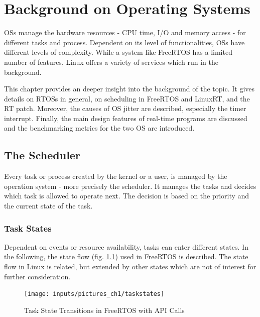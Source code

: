 \chapter{Background on Operating Systems}\label{ch_background}
\acp{OS} manage the hardware resources - \ac{CPU} time, \ac{I/O} and memory access  - for different tasks and process. 
Dependent on its level of functionalities, \acp{OS} have different levels of complexity.
While a system like FreeRTOS has a limited number of features, Linux offers a variety of services which run in the background. 
\par

This chapter provides an deeper insight into the background of the topic. 
It gives details on \acp{RTOS} in general, on scheduling in FreeRTOS and LinuxRT, and the RT patch. 
Moreover, the causes of \ac{OS} jitter are described, especially the timer interrupt. 
Finally, the main design features of real-time programs are discussed and the benchmarking metrics for the two \ac{OS} are introduced. 

\section{The Scheduler}\label{s_scheduler}
Every task or process created by the kernel or a user, is managed by the operation system - more precisely the scheduler. 
It manages the tasks and decides which task is allowed to operate next. 
The decision is based on the priority and the current state of the task. 

\subsection{Task States}\label{ss_task_states}
Dependent on events or resource availability, tasks can enter different states. 
In the following, the state flow (fig. \ref{fig_taskstates}) used in FreeRTOS \cite{freertos} is described. 
The state flow in Linux is related, but extended by other states which are not of interest for further consideration. 

\begin{figure}[htb]
	\begin{center}
		\texttt{[image: inputs/pictures\_ch1/taskstates]}
	\end{center}
	\caption[Task State Transitions in FreeRTOS]{Task State Transitions in FreeRTOS with API Calls \cite{freertos}} \label{fig_taskstates}
\end{figure}

